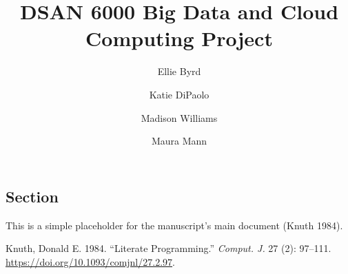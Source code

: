 \documentclass[
  letterpaper,
  DIV=11,
  numbers=noendperiod]{scrartcl}
\title{DSAN 6000 Big Data and Cloud Computing Project}
\author{Ellie Byrd \and Katie DiPaolo \and Madison Williams \and Maura
Mann}
\date{}
\newlength{\cslhangindent}
\newenvironment{CSLReferences}[2] %
 {\begin{list}{}{%
  \setlength{\itemindent}{0pt}
  \setlength{\leftmargin}{0pt}
  \setlength{\parsep}{0pt}
  \ifodd #1
   \setlength{\leftmargin}{\cslhangindent}
   \setlength{\itemindent}{-1\cslhangindent}
  \fi
  \setlength{\itemsep}{#2\baselineskip}}}
 {\end{list}}
\begin{document}
\maketitle


\subsection{Section}\label{section}

This is a simple placeholder for the manuscript's main document (Knuth
1984).

\label{refs}
\begin{CSLReferences}{1}{0}
Knuth, Donald E. 1984. {``Literate Programming.''} \emph{Comput. J.} 27
(2): 97--111. \url{https://doi.org/10.1093/comjnl/27.2.97}.

\end{CSLReferences}
\end{document}
